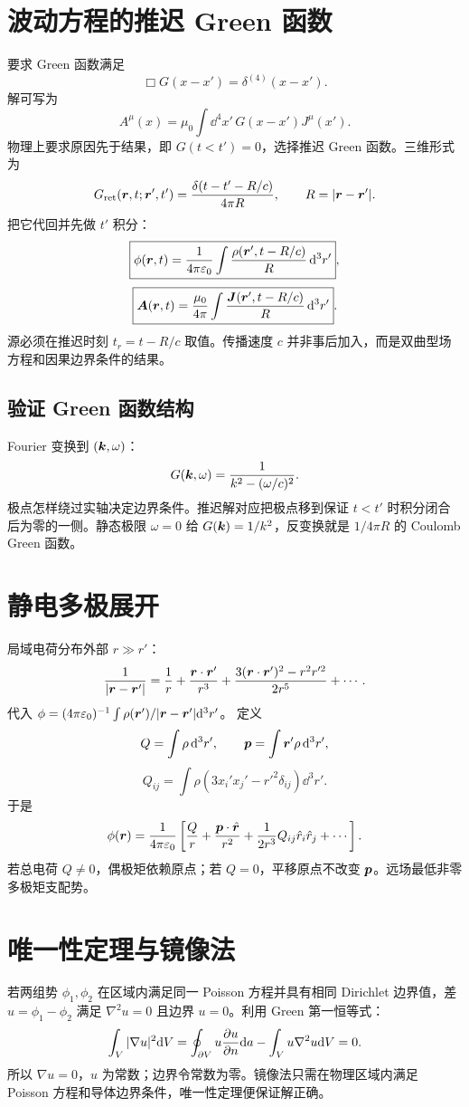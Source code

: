 \section{波动方程的推迟 Green 函数}
要求 Green 函数满足
\[
\Box G(x-x')=\delta^{(4)}(x-x').
\]
解可写为
\[
A^\mu(x)=\mu_0\int\dd^4x'\,G(x-x')J^\mu(x').
\]
物理上要求原因先于结果，即 $G(t<t')=0$，选择推迟 Green 函数。三维形式为
\[
G_{\rm ret}(\bm{r},t;\bm{r}',t')
=\frac{\delta(t-t'-R/c)}{4\pi R},
\qquad R=|\bm{r}-\bm{r}'|.
\]
把它代回并先做 $t'$ 积分：
\[
\boxed{
\phi(\bm{r},t)=\frac1{4\pi\varepsilon_0}
\int\frac{\rho(\bm{r}',t-R/c)}R\,\mathrm d^3r'},
\]
\[
\boxed{
\bm{A}(\bm{r},t)=\frac{\mu_0}{4\pi}
\int\frac{\bm{J}(\bm{r}',t-R/c)}R\,\mathrm d^3r'}.
\]
源必须在推迟时刻 $t_r=t-R/c$ 取值。传播速度 $c$ 并非事后加入，而是双曲型场方程和因果边界条件的结果。

\subsection{验证 Green 函数结构}
Fourier 变换到 $(\bm{k},\omega)$：
\[
G(\bm{k},\omega)
=\frac1{k^2-(\omega/c)^2}.
\]
极点怎样绕过实轴决定边界条件。推迟解对应把极点移到保证
$t<t'$ 时积分闭合后为零的一侧。静态极限 $\omega=0$ 给
$G(\bm{k})=1/k^2$，反变换就是 $1/4\pi R$ 的 Coulomb Green 函数。

\section{静电多极展开}
局域电荷分布外部 $r\gg r'$：
\[
\frac1{|\bm{r}-\bm{r}'|}
=\frac1r+\frac{\bm{r}\cdot\bm{r}'}{r^3}
+\frac{3(\bm{r}\cdot\bm{r}')^2-r^2r'^2}{2r^5}
+\cdots.
\]
代入
$\phi=(4\pi\varepsilon_0)^{-1}\int\rho(\bm{r}')/|\bm{r}-\bm{r}'|\mathrm d^3r'$。
定义
\[
Q=\int\rho\,\mathrm d^3r',\qquad
\bm{p}=\int\bm{r}'\rho\,\mathrm d^3r',
\]
\[
Q_{ij}=\int\rho(3x_i'x_j'-r'^2\delta_{ij})\dd^3r'.
\]
于是
\[
\phi(\bm{r})=\frac1{4\pi\varepsilon_0}
\left[\frac Qr+\frac{\bm{p}\cdot\hat{\bm{r}}}{r^2}
+\frac1{2r^3}Q_{ij}\hat r_i\hat r_j+\cdots\right].
\]
若总电荷 $Q\ne0$，偶极矩依赖原点；若 $Q=0$，平移原点不改变 $\bm{p}$。远场最低非零多极矩支配势。

\section{唯一性定理与镜像法}
若两组势 $\phi_1,\phi_2$ 在区域内满足同一 Poisson 方程并具有相同 Dirichlet 边界值，差
$u=\phi_1-\phi_2$ 满足 $\nabla^2u=0$ 且边界 $u=0$。利用 Green 第一恒等式：
\[
\int_V|\nabla u|^2\mathrm d V
=\oint_{\partial V}u\frac{\partial u}{\partial n}\mathrm d a-\int_Vu\nabla^2u\mathrm d V=0.
\]
所以 $\nabla u=0$，$u$ 为常数；边界令常数为零。镜像法只需在物理区域内满足 Poisson 方程和导体边界条件，唯一性定理便保证解正确。

